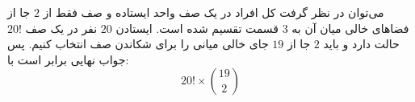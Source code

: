\p
می‌توان در نظر گرفت کل افراد در یک صف واحد ایستاده و صف فقط از
$2$
 جا از فضاهای خالی میان آن به
$3$
  قسمت تقسیم شده است. ایستادن
$20$
   نفر در یک صف
$20!$ 
   حالت دارد و باید
$2$
    جا از
$19$ 
    جای خالی میانی را برای شکاندن صف انتخاب کنیم. پس جواب نهایی برابر است با:
    \[20! \times \binom{19}{2}\]
